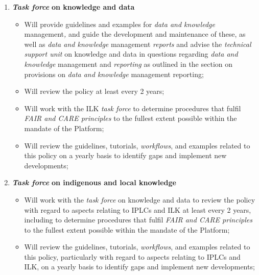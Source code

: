 \documentclass{article}
\begin{document}
\begin{enumerate}[label=(\alph*)]
    \item \textit{\textbf{Task force}}\textbf{ on knowledge and data}
    \begin{itemize}
        \item Will provide guidelines and examples for \textit{data and knowledge }management\textit{, }and guide the development and maintenance of these, as well as \textit{data and knowledge }management \textit{reports} and advise the \textit{technical support unit} on knowledge and data in questions regarding \textit{data and knowledge }management and\textit{ reporting} as outlined in the section on provisions on \textit{data and knowledge} management reporting;
        \item Will review the policy at least every 2 years;
        \item Will work with the ILK \textit{task force }to determine procedures that fulfil \textit{FAIR and CARE principles} to the fullest extent possible within the mandate of the Platform;
        \item Will review the guidelines, tutorials, \textit{workflows}, and examples related to this policy on a yearly basis to identify gaps and implement new developments;
    \end{itemize}

    \item \textit{\textbf{Task force}}\textbf{ on indigenous and local knowledge}
    \begin{itemize}
        \item Will work with the \textit{task force} on knowledge and data to review the policy with regard to aspects relating to IPLCs and ILK at least every 2 years, including to determine procedures that fulfil \textit{FAIR and CARE principles} to the fullest extent possible within the mandate of the Platform;
        \item Will review the guidelines, tutorials, \textit{workflows}, and examples related to this policy, particularly with regard to aspects relating to IPLCs and ILK, on a yearly basis to identify gaps and implement new developments;
    \end{itemize}


\end{enumerate}
\end{document}
